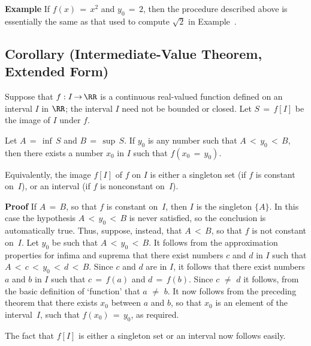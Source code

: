 \V

        {\bf Example} If $f(x) \,=\, x^{2}$ and $y_{0} \,=\, 2$, then the procedure described above
    is essentially the same as that used to compute $\sqrt{2}$ in Example~.

\VV


            \subsection{\small{\bf Corollary} (Intermediate-Value Theorem, Extended Form)}
            \label{CorD25.40}

\V

        Suppose that $f:I \,{\rightarrow}\, {\RR}$ is a continuous real-valued function defined on an interval $I$ in ${\RR}$;
    the interval $I$ need not be bounded or closed. Let $S \,=\, f[I]$ be the image of $I$ under $f$.

\V
        Let $A \,=\, {\inf}\,S$ and $B \,=\, {\sup}\,S$. If $y_{0}$ is any number such that $A\,<\,y_{0}\,<\,B$,
    then there exists a number $x_{0}$ in $I$ such that $f(x_{0} \,=\, y_{0})$.

        Equivalently, the image $f[I]$ of $f$ on $I$ is either a singleton set (if $f$ is constant on~$I$), or an interval (if $f$ is nonconstant on~$I$).

\V

        {\bf Proof} If $A \,=\, B$, so that $f$ is constant on~$I$, then $I$ is the singleton $\{A\}$.
    In this case the hypothesis $A\,<\,y_{0}\,<\,B$ is never satisfied, so the conclusion is automatically true.
    Thus, suppose, instead, that $A\,<\,B$, so that $f$ is not constant on~$I$. Let $y_{0}$ be such that $A\,<\,y_{0}\,<\,B$.
    It follows from the approximation properties for infima and suprema that there exist numbers $c$ and $d$
    in $I$ such that $A\,<\,c\,<\,y_{0}\,<\,d\,<\,B$. Since $c$ and $d$ are in $I$, it follows that
    there exist numbers $a$ and $b$ in $I$ such that $c \,=\, f(a)$ and $d \,=\, f(b)$. Since $c \,\,{\neq}\,\, d$ it follows,
    from the basic definition of `function' that $a \,\,{\neq}\,\, b$. It now follows from the preceding theorem that
    there exists $x_{0}$ between $a$ and $b$, so that $x_{0}$ is an element of the interval~$I$, such that $f(x_{0}) \,=\, y_{0}$, as required.

        The fact that $f[I]$ is either a singleton set or an interval now follows easily.
    

